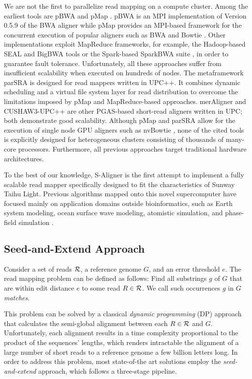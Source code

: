 We are not the first to parallelize read mapping on a compute
cluster. Among the earliest tools are pBWA \cite{pbwa} and pMap
\cite{pmap}. pBWA is an MPI implementation of Version 0.5.9 of the BWA
aligner while pMap provides an MPI-based framework for the concurrent
execution of popular aligners such as BWA \cite{bwa} and Bowtie
\cite{bowtie}. Other implementations exploit MapReduce frameworks, for
example, the Hadoop-based SEAL \cite{seal} and BigBWA \cite{bigbwa}
tools or the Spark-based SparkBWA suite \cite{sparkBWA}, in order to
guarantee fault tolerance. Unfortunately, all these approaches suffer
from insufficient scalability when executed on hundreds of nodes. The
metaframework parSRA \cite{parSRA} is designed for read mappers
written in UPC++.  It combines dynamic scheduling and a virtual file
system layer for read distribution to overcome the limitations imposed
by pMap and MapReduce-based approaches. merAligner \cite{merAligner}
and CUSHAW3-UPC++ \cite{cushaw3upc} are other PGAS-based short-read
aligners written in UPC; both demonstrate good scalability. Although
pMap and parSRA allow for the execution of single node GPU aligners
such as nvBowtie \cite{nvBio}, none of the cited tools is explicitly
designed for heterogeneous clusters consisting of thousands of
many-core processors. Furthermore, all previous approaches target
traditional hardware architectures.

To the best of our knowledge, S-Aligner is the first attempt to
implement a fully scalable read mapper specifically designed to fit
the characteristics of Sunway Taihu Light. Previous algorithms mapped
onto this novel supercomputer have focused mainly on application
domains outside bioinformatics, such as Earth system modeling, ocean
surface wave modeling, atomistic simulation, and phase-field
simulation \cite{sunway}.

\subsection{Seed-and-Extend Approach}

Consider a set of reads ${\cal R}$, a reference genome $G$, and an
error threshold $e$. The read mapping problem can be defined as
follows: Find all substrings $g$ of $G$ that are within edit distance
$e$ to some read $R \in {\cal R}$. We call such occurrences $g$ in $G$
{\em matches}.

This problem can be solved by a classical {\em dynamic programming}
(DP) approach that calculates the semi-global alignment between each
$R \in {\cal R}$ and $G$. Unfortunately, each alignment results in a
time complexity proportional to the product of the sequences' lengths,
which renders intractable the alignment of a large number of short
reads to a reference genome a few billion letters long.  In order to
address this problem, most state-of-the art solutions \cite{Reinert}
employ the {\em seed-and-extend} approach, which follows a three-stage
pipeline.

